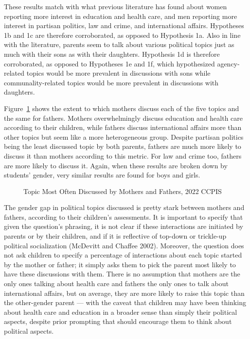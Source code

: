 \documentclass[
  letterpaper,
  DIV=11,
  numbers=noendperiod]{scrreprt}
\begin{document}
These results match with what previous literature has found about women
reporting more interest in education and health care, and men reporting
more interest in partisan politics, law and crime, and international
affairs. Hypotheses 1b and 1c are therefore corroborated, as opposed to
Hypothesis 1a. Also in line with the literature, parents seem to talk
about various political topics just as much with their sons as with
their daughters. Hypothesis 1d is therefore corroborated, as opposed to
Hypotheses 1e and 1f, which hypothesized agency-related topics would be
more prevalent in discussions with sons while communality-related topics
would be more prevalent in discussions with daughters.

Figure~\ref{fig-parentsmomdad} shows the extent to which mothers discuss
each of the five topics and the same for fathers. Mothers overwhelmingly
discuss education and health care according to their children, while
fathers discuss international affairs more than other topics but seem
like a more heterogeneous group. Despite partisan politics being the
least discussed topic by both parents, fathers are much more likely to
discuss it than mothers according to this metric. For law and crime too,
fathers are more likely to discuss it. Again, when these results are
broken down by students' gender, very similar results are found for boys
and girls.

\begin{figure}


\caption{\label{fig-parentsmomdad}Topic Most Often Discussed by Mothers
and Fathers, 2022 CCPIS}

\end{figure}%

The gender gap in political topics discussed is pretty stark between
mothers and fathers, according to their children's assessments. It is
important to specify that given the question's phrasing, it is not clear
if these interactions are initiated by parents or by their children, and
if it is reflective of top-down or trickle-up political socialization
(McDevitt and Chaffee 2002). Moreover, the question does not ask
children to specify a percentage of interactions about each topic
started by the mother or father; it simply asks them to pick the parent
most likely to have these discussions with them. There is no assumption
that mothers are the only ones talking about health care and fathers the
only ones to talk about international affairs, but on average, they are
more likely to raise this topic than the other-gender parent --- with
the caveat that children may have been thinking about health care and
education in a broader sense than simply their political aspects,
despite prior prompting that should encourage them to think about
political aspects.
\end{document}
